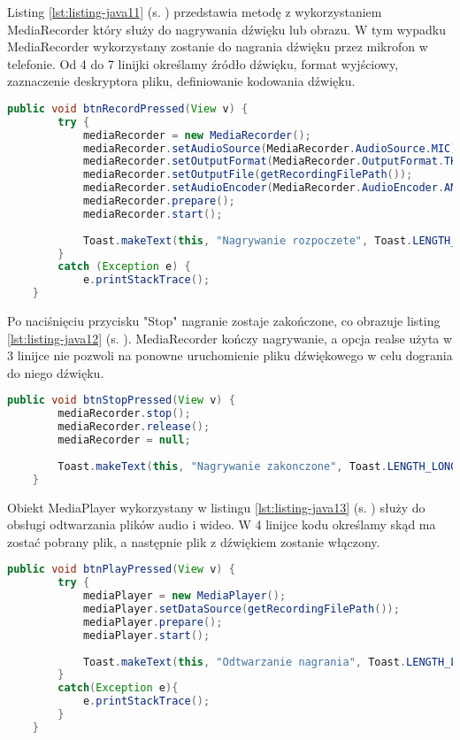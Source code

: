 Listing \ref{lst:listing-java11} (s. \pageref{lst:listing-java11}) przedstawia metodę z wykorzystaniem MediaRecorder który służy do nagrywania dźwięku lub obrazu. W tym wypadku MediaRecorder wykorzystany zostanie do nagrania dźwięku przez mikrofon w telefonie. Od 4 do 7 linijki określamy źródło dźwięku, format wyjściowy, zaznaczenie deskryptora pliku, definiowanie kodowania dźwięku.
\begin{lstlisting}[caption=Mikrofon - Włączenie nagrywania, label={lst:listing-java11}, language=Java]
	public void btnRecordPressed(View v) {
		try {
			mediaRecorder = new MediaRecorder();
			mediaRecorder.setAudioSource(MediaRecorder.AudioSource.MIC);
			mediaRecorder.setOutputFormat(MediaRecorder.OutputFormat.THREE_GPP);
			mediaRecorder.setOutputFile(getRecordingFilePath());
			mediaRecorder.setAudioEncoder(MediaRecorder.AudioEncoder.AMR_NB);
			mediaRecorder.prepare();
			mediaRecorder.start();
			
			Toast.makeText(this, "Nagrywanie rozpoczete", Toast.LENGTH_LONG).show();
		}
		catch (Exception e) {
			e.printStackTrace();
	}
\end{lstlisting}
	
\newpage
	
	
Po naciśnięciu przycisku "Stop" nagranie zostaje zakończone, co obrazuje listing \ref{lst:listing-java12} (s. \pageref{lst:listing-java12}). MediaRecorder kończy nagrywanie, a opcja realse użyta w 3 linijce nie pozwoli na ponowne uruchomienie pliku dźwiękowego w celu dogrania do niego dźwięku.
\begin{lstlisting}[caption=Mikrofon - Przerwanie nagrywania, label={lst:listing-java12}, language=Java]
	public void btnStopPressed(View v) {
		mediaRecorder.stop();
		mediaRecorder.release();
		mediaRecorder = null;
			
		Toast.makeText(this, "Nagrywanie zakonczone", Toast.LENGTH_LONG).show();
	}
\end{lstlisting}
	
Obiekt MediaPlayer wykorzystany w listingu \ref{lst:listing-java13} (s. \pageref{lst:listing-java13}) służy do obsługi odtwarzania plików audio i wideo. W 4 linijce kodu określamy skąd ma zostać pobrany plik, a następnie plik z dźwiękiem zostanie włączony.
\begin{lstlisting}[caption=Mikrofon - Odtworzenie nagrania, label={lst:listing-java13}, language=Java]
	public void btnPlayPressed(View v) {
		try {
			mediaPlayer = new MediaPlayer();
			mediaPlayer.setDataSource(getRecordingFilePath());
			mediaPlayer.prepare();
			mediaPlayer.start();
				
			Toast.makeText(this, "Odtwarzanie nagrania", Toast.LENGTH_LONG).show();
		}
		catch(Exception e){
			e.printStackTrace();
		}
	}
\end{lstlisting}

